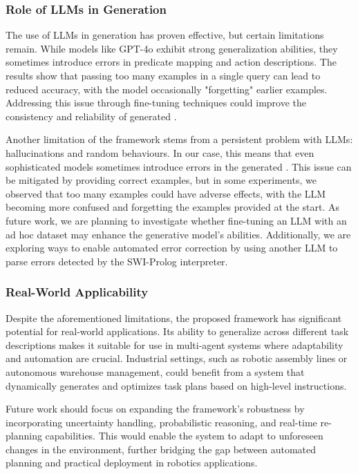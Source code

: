 \subsubsection{Role of LLMs in \kb Generation}
The use of LLMs in \kbase generation has proven effective, but certain limitations remain. While models like GPT-4o exhibit strong generalization abilities, they sometimes introduce errors in predicate mapping and action descriptions. The results show that passing too many examples in a single query can lead to reduced accuracy, with the model occasionally "forgetting" earlier examples. Addressing this issue through fine-tuning techniques could improve the consistency and reliability of generated \kbs.

Another limitation of the framework stems from a persistent problem 
with LLMs: hallucinations and random behaviours.  
In our case, this means that even sophisticated models sometimes 
introduce errors in the generated \kb. This issue can be mitigated 
by providing correct examples, but in some experiments, we observed that 
too many examples could have adverse effects, with the LLM becoming more 
confused and 
forgetting the examples provided at the start. As future work, we are 
planning to investigate whether fine-tuning an LLM with an ad hoc dataset 
may enhance the generative model's abilities. Additionally, we are exploring ways 
to enable automated error correction by using another LLM to parse 
errors detected by the SWI-Prolog interpreter.  

\subsubsection{Real-World Applicability}
Despite the aforementioned limitations, the proposed framework has significant potential for real-world applications. Its ability to generalize across different task descriptions makes it suitable for use in multi-agent systems where adaptability and automation are crucial. Industrial settings, such as robotic assembly lines or autonomous warehouse management, could benefit from a system that dynamically generates and optimizes task plans based on high-level instructions.

Future work should focus on expanding the framework's robustness by incorporating uncertainty handling, probabilistic reasoning, and real-time re-planning capabilities. This would enable the system to adapt to unforeseen changes in the environment, further bridging the gap between automated planning and practical deployment in robotics applications.









